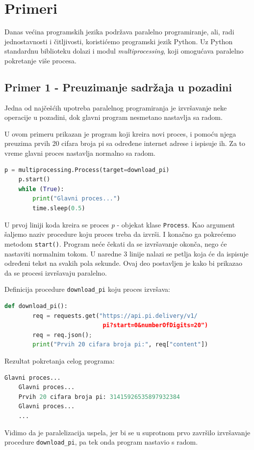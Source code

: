\documentclass[a4paper]{article}
\begin{document}
	
	\section{Primeri}
    Danas većina programskih jezika podržava paralelno programiranje, ali, radi jednostavnosti i čitljivosti, koristićemo programski jezik Python. Uz Python standardnu biblioteku dolazi i modul \emph{multiprocessing}, koji omogućava paralelno pokretanje više procesa.
    \subsection{Primer 1 - Preuzimanje sadržaja u pozadini}
    Jedna od najčešćih upotreba paralelnog programiranja je izvršavanje neke operacije u pozadini, dok glavni program nesmetano nastavlja sa radom. 
    \par U ovom primeru prikazan je program koji kreira novi proces, i pomoću njega preuzima prvih 20 cifara broja pi sa određene internet adrese i ispisuje ih. Za to vreme glavni proces nastavlja normalno sa radom.
    \begin{lstlisting}[showstringspaces=false, language=Python]
    p = multiprocessing.Process(target=download_pi)
    p.start()
    while (True):
        print("Glavni proces...")
        time.sleep(0.5)
    \end{lstlisting}
    U prvoj liniji koda kreira se proces \emph{p} - objekat klase \lstinline{Process}. Kao argument šaljemo naziv procedure koju proces treba da izvrši. I konačno ga pokrećemo metodom \lstinline{start()}. Program neće čekati da se izvršavanje okonča, nego će nastaviti normalnim tokom. U naredne 3 linije nalazi se petlja koja će da ispisuje određeni tekst na svakih pola sekunde. Ovaj deo postavljen je kako bi prikazao da se procesi izvršavaju paralelno.
    \par Definicija procedure \lstinline{download_pi} koju proces izvršava:
    
    \begin{lstlisting}[showstringspaces=false, language=Python]
    def download_pi():
        req = requests.get("https://api.pi.delivery/v1/
                            pi?start=0&numberOfDigits=20")
        req = req.json();
        print("Prvih 20 cifara broja pi:", req["content"])
    \end{lstlisting}
    \par Rezultat pokretanja celog programa:
    \begin{lstlisting}[showstringspaces=false, language=Python]
    Glavni proces...
    Glavni proces...
    Prvih 20 cifara broja pi: 31415926535897932384
    Glavni proces...
    ...
    \end{lstlisting}
    Vidimo da je paralelizacija uspela, jer bi se u suprotnom prvo završilo izvršavanje procedure \lstinline{download_pi}, pa tek onda program nastavio s radom.
\end{document}
